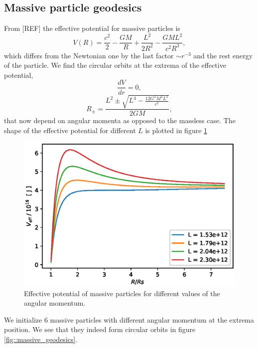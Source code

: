 \documentclass[journal, a4paper]{IEEEtran}
\begin{document}
\subsection{Massive particle geodesics}
From [REF] the effective potential for massive particles is
\begin{equation}
	V(R) = \frac{c^2}{2} - \frac{GM}{R} + \frac{L^2}{2R^2} - \frac{GML^2}{c^2R^3},
\end{equation}
which differs from the Newtonian one by the last factor $\sim r^{-3}$ and the rest energy of the particle. We find the circular orbits at the extrema of the effective potential,
\begin{equation}
	\frac{dV}{dr} = 0,
\end{equation}
\begin{equation}
	R_{\pm} = \frac{L^2 \pm \sqrt{ L^4 - \frac{12 G^2 M^2 L^2}{ c^2} } }{2 G M},
\end{equation}
that now depend on angular momenta as opposed to the massless case. The shape of the effective potential for different $L$ is plotted in figure \ref{fig::Veff_massive}
\begin{figure}[!hbt]
	\begin{center}
	\includegraphics[width=\columnwidth]{Veff_massive.eps}
	\caption{Effective potential of massive particles for different values of the angular momentum.}
	\label{fig::Veff_massive}
\end{center}
\end{figure}
We initialize 6 massive particles with different angular momentum at the extrema position. We see that they indeed form circular orbits in figure \ref{fig::massive_geodesics}.
\end{document}
